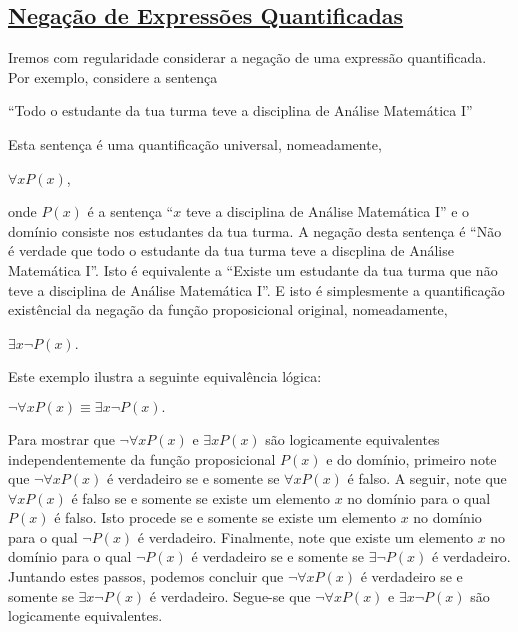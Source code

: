 \subsection*{\underline{Negação de Expressões Quantificadas}}

Iremos com regularidade considerar a negação de uma expressão quantificada. Por
exemplo, considere a sentença

\begin{center}
``Todo o estudante da tua turma teve a disciplina de Análise Matemática I''
\end{center}
Esta sentença é uma quantificação universal, nomeadamente,
\begin{center}
$\forall xP(x)$,
\end{center}

onde $P(x)$ é a sentença ``$x$ teve a disciplina de Análise Matemática I'' e o
domínio consiste nos estudantes da tua turma. A negação desta sentença é ``Não é
verdade que todo o estudante da tua turma teve a discplina de Análise Matemática
I''. Isto é equivalente a ``Existe um estudante da tua turma que não teve a
disciplina de Análise Matemática I''. E isto é simplesmente a quantificação
existêncial da negação da função proposicional original, nomeadamente,

\begin{center}
$\exists x\lnot P(x)$.
\end{center}

Este exemplo ilustra a seguinte equivalência lógica:
\begin{center}
\colorbox{blue!10}{$\lnot\forall xP(x) \equiv \exists x\lnot P(x).$}
\end{center}

Para mostrar que $\lnot\forall xP(x)$ e $\exists xP(x)$ são logicamente
equivalentes independentemente da função proposicional $P(x)$ e do domínio,
primeiro note que $\lnot\forall xP(x)$ é verdadeiro se e somente se $\forall
xP(x)$ é falso. A seguir, note que $\forall xP(x)$ é falso se e somente se
existe um elemento $x$ no domínio para o qual $P(x)$ é falso. Isto procede se e
somente se existe um elemento $x$ no domínio para o qual $\lnot P(x)$ é
verdadeiro. Finalmente, note que existe um elemento $x$ no domínio para o qual
$\lnot P(x)$ é verdadeiro se e somente se $\exists \lnot P(x)$ é verdadeiro.
Juntando estes passos, podemos concluir que $\lnot \forall xP(x)$ é verdadeiro
se e somente se $\exists x\lnot P(x)$ é verdadeiro. Segue-se que $\lnot\forall
xP(x)$ e $\exists x\lnot P(x)$ são logicamente equivalentes.

